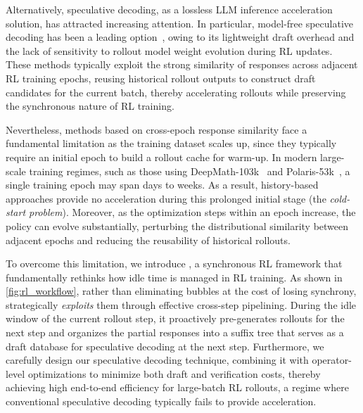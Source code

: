 Alternatively, speculative decoding, as a lossless LLM inference acceleration solution, has attracted increasing attention.
In particular, model-free speculative decoding has been a leading option~\cite{he2025history_rhyme, liu2025specRL}, owing to its lightweight draft overhead and the lack of sensitivity to rollout model weight evolution during RL updates. 
These methods typically exploit the strong similarity of responses across adjacent RL training epochs, reusing historical rollout outputs to construct draft candidates for the current batch, thereby accelerating rollouts while preserving the synchronous nature of RL training.


Nevertheless, methods based on cross-epoch response similarity face a fundamental limitation as the training dataset scales up, since they typically require an initial epoch to build a rollout cache for warm-up. 
In modern large-scale training regimes, such as those using DeepMath-103k~\cite{he2025deepmath} and Polaris-53k~\cite{an2025polaris}, a single training epoch may span days to weeks. 
As a result, history-based approaches provide no acceleration during this prolonged initial stage (\ie the \textit{cold-start problem}). Moreover, as the optimization steps within an epoch increase, the policy can evolve substantially, perturbing the distributional similarity between adjacent epochs and reducing the reusability of historical rollouts.

To overcome this limitation, we introduce \textbf{\model}, a synchronous RL framework that fundamentally rethinks how idle time is managed in RL training. As shown in \autoref{fig:rl_workflow}, rather than eliminating bubbles at the cost of losing synchrony, \model strategically \emph{exploits} them through effective cross-step pipelining. 
During the idle window of the current rollout step, it proactively pre-generates rollouts for the next step and organizes the partial responses into a suffix tree that serves as a draft database for speculative decoding at the next step. 
Furthermore, we carefully design our speculative decoding technique, combining it with operator-level optimizations to minimize both draft and verification costs, thereby achieving high end-to-end efficiency for large-batch RL rollouts, a regime where conventional speculative decoding typically fails to provide acceleration.

